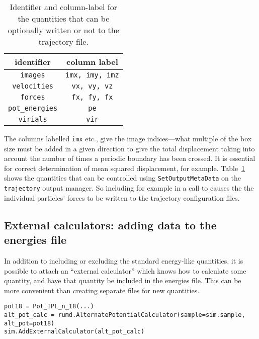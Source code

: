 \documentclass[a4paper]{article}
\begin{document}
\begin{table}
  \caption{\label{trajectoryQuantities}Identifier and column-label for the
    quantities that can be optionally written or not to the trajectory file.}
  \begin{center}
      \begin{tabular}{|c|c|}
        \hline
        identifier & column label \\
        \hline
        \verb|images| & \verb|imx, imy, imz| \\
        \verb|velocities| & \verb|vx, vy, vz| \\
        \verb|forces| & \verb|fx, fy, fx| \\
        \verb|pot_energies| & \verb|pe| \\
        \verb|virials| & \verb|vir| \\
        \hline
      \end{tabular}
      \end{center}
    
  \end{table}

The columns labelled \verb|imx| etc., give the image indices---what multiple of
the box size must be added in a given direction to give the total displacement
taking into account the number of times a periodic boundary has been crossed. 
It is essential for correct determination of mean squared displacement, for
example. Table~\ref{trajectoryQuantities} shows the quantities that can be
controlled using \verb|SetOutputMetaData| on the  \verb|trajectory| output
manager. So including   for example in a call to    causes the the individual particles' forces to be written to the trajectory configuration files.



\subsection{External calculators: adding data to the energies file}

In addition to including or excluding the standard energy-like quantities, it
is possible to attach an ``external calculator'' which knows how to calculate
some quantity, and have that quantity be included in the energies file. This
can be more convenient than creating separate files for new quantities.

\begin{verbatim}
pot18 = Pot_IPL_n_18(...)
alt_pot_calc = rumd.AlternatePotentialCalculator(sample=sim.sample, alt_pot=pot18)
sim.AddExternalCalculator(alt_pot_calc)
\end{verbatim}
\end{document}
